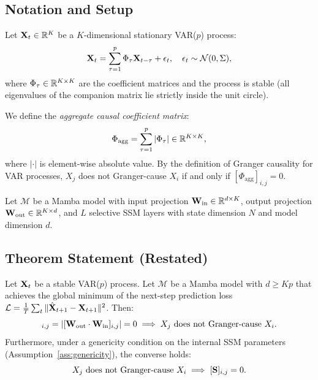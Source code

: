 
\subsection*{Notation and Setup}

Let $\mathbf{X}_t \in \mathbb{R}^K$ be a $K$-dimensional stationary VAR($p$) process:
\begin{equation}
    \mathbf{X}_t = \sum_{\tau=1}^{p} \Phi_\tau \mathbf{X}_{t-\tau} + \epsilon_t,
    \quad \epsilon_t \sim \mathcal{N}(0, \Sigma),
    \label{eq:app_var_p}
\end{equation}
where $\Phi_\tau \in \mathbb{R}^{K \times K}$ are the coefficient matrices and the
process is stable (all eigenvalues of the companion matrix lie strictly
inside the unit circle).

We define the \emph{aggregate causal coefficient matrix}:
\begin{equation}
    \Phi_{\text{agg}} = \sum_{\tau=1}^{p} |\Phi_\tau| \in \mathbb{R}^{K \times K},
\end{equation}
where $|\cdot|$ is element-wise absolute value. By the definition of
Granger causality for VAR processes, $X_j$ does not Granger-cause $X_i$
if and only if $[\Phi_{\text{agg}}]_{i,j} = 0$.

Let $\mathcal{M}$ be a Mamba model with input projection
$\mathbf{W}_{\text{in}} \in \mathbb{R}^{d \times K}$, output projection
$\mathbf{W}_{\text{out}} \in \mathbb{R}^{K \times d}$, and $L$ selective SSM layers
with state dimension $N$ and model dimension $d$.

\subsection*{Theorem Statement (Restated)}

\begin{theorem}[Restated]
Let $\mathbf{X}_t$ be a stable VAR($p$) process. Let $\mathcal{M}$ be a Mamba
model with $d \geq Kp$ that achieves the global minimum of the next-step
prediction loss $\mathcal{L} = \frac{1}{T}\sum_t \|\hat{\mathbf{X}}_{t+1} -
\mathbf{X}_{t+1}\|^2$. Then:
\begin{equation}
    [\bS]_{i,j} = |[\bW_{\text{out}} \cdot \bW_{\text{in}}]_{i,j}| = 0
    \implies X_j \text{ does not Granger-cause } X_i.
\end{equation}
Furthermore, under a genericity condition on the internal SSM parameters
(Assumption~\ref{ass:genericity}), the converse holds:
\begin{equation}
    X_j \text{ does not Granger-cause } X_i
    \implies [\mathbf{S}]_{i,j} = 0.
\end{equation}
\end{theorem}


